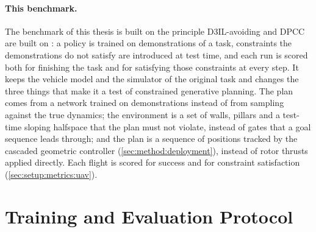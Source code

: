 \paragraph{This benchmark.} The benchmark of this thesis is built on the principle D3IL-avoiding and
\ac{DPCC} are built on \parencite{jia2024towards,romer2025diffusion}: a policy is trained on
demonstrations of a task, constraints the demonstrations do not satisfy are introduced at test time, and
each run is scored both for finishing the task and for satisfying those constraints at every step. It
keeps the vehicle model and the simulator of the original task and
changes the three things that make it a test of constrained generative planning. The plan comes
from a network trained on demonstrations instead of from sampling against the true dynamics; the
environment is a set of walls, pillars and a test-time sloping halfspace that the plan must not violate, instead of
gates that a goal sequence leads through; and the plan is a sequence of positions tracked by the
cascaded geometric controller (\autoref{sec:method:deployment}), instead of rotor thrusts applied
directly. Each flight is scored for success and for constraint satisfaction (\autoref{sec:setup:metrics:uav}).


\section{Training and Evaluation Protocol}\label{sec:setup:protocol}

